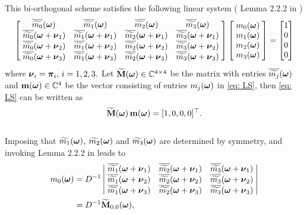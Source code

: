 This bi-orthogonal scheme satisfies the following linear system (
Lemma 2.2.2 in \cite{cohen1993compactly} )
\begin{align}\label{eq: LS}
\begin{bmatrix}
    \, \overline{\widetilde{m_0}}(\V{\omega}) &  \overline{\widetilde{m_1}}(\V{\omega}) &  \overline{\widetilde{m_2}}(\V{\omega}) &  \overline{\widetilde{m_3}}(\V{\omega})\; \\
    \;\sbarmn{0}{1} & \sbarmn{1}{1}  & \sbarmn{2}{1}  & \sbarmn{3}{1}\; \\
    \;\sbarmn{0}{2} & \sbarmn{1}{2}  & \sbarmn{2}{2}  & \sbarmn{3}{2}\; \\
    \;\sbarmn{0}{3} & \sbarmn{1}{3} & \sbarmn{2}{3} & \sbarmn{3}{3}\;
\end{bmatrix}
\begin{bmatrix}
\;\mo{0}\; \\
\;\mo{1}\; \\
\;\mo{2}\; \\
\;\mo{3}\; 
\end{bmatrix} 
=
\begin{bmatrix}
1\\
0\\
0\\
0
\end{bmatrix}
\end{align}
 where $\V{\nu}_i = \V{\pi}_i,\, i = 1,2,3.$ %
 Let $\widetilde{\mathbf{M}}(\V{\omega})\in\mathbb{C}^{4\times 4}$ be the matrix with entries $\sbarm{j}$ and $\mathbf{m}(\V{\omega})\in\mathbb{C}^4$ be the vector consisting of entries $m_j(\V{\omega})$ in \eqref{eq: LS}, then \eqref{eq: LS} can be written as \[\widetilde{\mathbf{M}}(\V{\omega})\, \mathbf{m} (\V{\omega})= [1,0,0,0]^\top.\]\\
Imposing that $\m{1}$, $\m{2}$ and $\m{3}$ are determined by symmetry, and invoking Lemma 2.2.2 in \cite{cohen1993compactly} leads to
\begin{align}\label{eq: m0-sol}
m_0(\V{\omega}) &= D^{-1}%
\left|
\begin{matrix}
    \; \sbarmn{1}{1}  & \sbarmn{2}{1}  & \sbarmn{3}{1}\; \\
    \; \sbarmn{1}{2}  & \sbarmn{2}{2}  & \sbarmn{3}{2}\; \\
    \; \sbarmn{1}{3} & \sbarmn{2}{3} & \sbarmn{3}{3}\;
\end{matrix}
\right| \notag\\
&= D^{-1}\widetilde{\mathbf{M}}_{0,0}(\V{\omega}),
\end{align}
